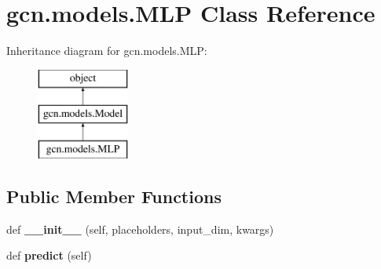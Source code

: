 \hypertarget{classgcn_1_1models_1_1MLP}{}\section{gcn.\+models.\+M\+LP Class Reference}
\label{classgcn_1_1models_1_1MLP}
Inheritance diagram for gcn.\+models.\+M\+LP\+:\begin{figure}[H]
\begin{center}
\leavevmode
\includegraphics[height=3.000000cm]{classgcn_1_1models_1_1MLP}
\end{center}
\end{figure}
\subsection*{Public Member Functions}
\begin{DoxyCompactItemize}
\item 
\mbox{\label{classgcn_1_1models_1_1MLP_aa957c7cac3b4b35120bf8ca144617865}} 
def {\bfseries \+\_\+\+\_\+init\+\_\+\+\_\+} (self, placeholders, input\+\_\+dim, kwargs)
\item 
\mbox{\label{classgcn_1_1models_1_1MLP_ad191d01995288619dac8dc1a8aa8d9fe}} 
def {\bfseries predict} (self)
\end{DoxyCompactItemize}
